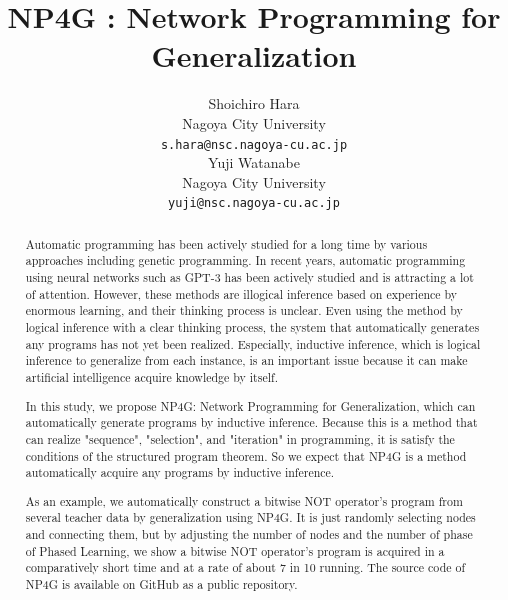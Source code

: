 \documentclass{article}
\title{NP4G : Network Programming for Generalization
}
\author{
  Shoichiro Hara \\
  Nagoya City University \\
  \texttt{s.hara@nsc.nagoya-cu.ac.jp} \\
   \And
  Yuji Watanabe \\
  Nagoya City University \\
  \texttt{yuji@nsc.nagoya-cu.ac.jp} \\
}
\begin{document}
\maketitle

\begin{abstract}
 Automatic programming has been actively studied for a long time by various approaches including genetic programming. In recent years, automatic programming using neural networks such as GPT-3 has been actively studied and is attracting a lot of attention. However, these methods are illogical inference based on experience by enormous learning, and their thinking process is unclear. Even using the method by logical inference with a clear thinking process, the system that automatically generates any programs has not yet been realized. Especially, inductive inference, which is logical inference to generalize from each instance, is an important issue because it can make artificial intelligence acquire knowledge by itself.
 
 In this study, we propose NP4G: Network Programming for Generalization, which can automatically generate programs by inductive inference. Because this is a method that can realize "sequence", "selection", and "iteration" in programming, it is satisfy the conditions of the structured program theorem. So we expect that NP4G is a method automatically acquire any programs by inductive inference.
 
 As an example, we automatically construct a bitwise NOT operator's program from several teacher data by generalization using NP4G. It is just randomly selecting nodes and connecting them, but by adjusting the number of nodes and the number of phase of Phased Learning, we show a bitwise NOT operator's program is acquired in a comparatively short time and at a rate of about 7 in 10 running.
 The source code of NP4G is available on GitHub as a public repository\footnotemark[1].
\end{abstract}



\end{document}
